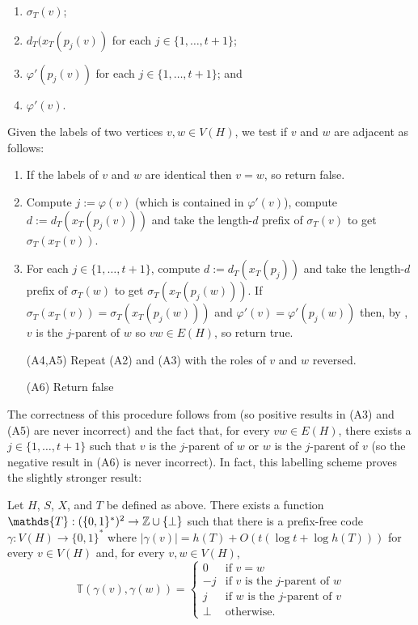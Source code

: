 \documentclass[kpfonts]{patmorin}
\begin{document}
\begin{enumerate}[(TC1)]
  \item $\sigma_T(v)$;
  \item $d_T(x_T(p_j(v))$ for each $j\in\{1,\ldots,t+1\}$; 
  \item $\varphi'(p_j(v))$ for each $j\in\{1,\ldots,t+1\}$; and
  \item $\varphi'(v)$.
\end{enumerate}

Given the labels of two vertices $v,w\in V(H)$, we test if $v$ and $w$ are adjacent as follows:
\begin{enumerate}[({A}1)]
  \item If the labels of $v$ and $w$ are identical then $v=w$, so return false.
  
  \item Compute $j:=\varphi(v)$ (which is contained in $\varphi'(v)$), compute $d:=d_T(x_T(p_j(v)))$ and take the length-$d$ prefix of $\sigma_T(v)$ to get $\sigma_T(x_T(v))$.

  \item For each $j\in\{1,\ldots,t+1\}$, compute $d:=d_T(x_T(p_j))$ and take the length-$d$ prefix of $\sigma_T(w)$ to get $\sigma_T(x_T(p_j(w)))$.  If $\sigma_T(x_T(v))=\sigma_T(x_T(p_j(w)))$ and $\varphi'(v)=\varphi'(p_j(w))$ then, by , $v$ is the $j$-parent of $w$ so $vw\in E(H)$, so return true.
  
  \item[(A4,A5)] Repeat (A2) and (A3) with the roles of $v$ and $w$ reversed.
  
  \item[(A6)] Return false
\end{enumerate}

The correctness of this procedure follows from  (so positive results in (A3) and (A5) are never incorrect) and the fact that, for every $vw\in E(H)$, there exists a $j\in\{1,\ldots,t+1\}$ such that $v$ is the $j$-parent of $w$ or $w$ is the $j$-parent of $v$ (so the negative result in (A6) is never incorrect).  In fact, this labelling scheme proves the slightly stronger result:

\begin{lem}
  Let $H$, $S$, $X$, and $T$ be defined as above.  There exists a function $\mathds{T}:(\{0,1\}^*)^2\to \Z\cup\{\perp\}$ such that there is a prefix-free code $\gamma:V(H)\to\{0,1\}^*$ where $|\gamma(v)|=h(T) + O(t(\log t + \log h(T)))$ for every $v\in V(H)$ and, for every $v,w\in V(H)$, 
  \[
      \mathds{T}(\gamma(v),\gamma(w)) = \begin{cases}
      0 & \text{if $v=w$} \\
      -j & \text{if $v$ is the $j$-parent of $w$} \\
      j & \text{if $w$ is the $j$-parent of $v$} \\
      \perp & \text{otherwise.}
    \end{cases}
  \]
\end{lem}
\end{document}

